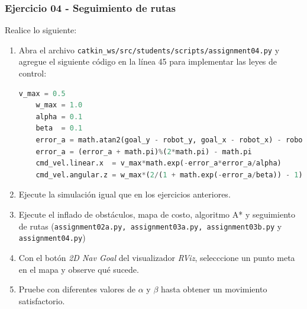 \begin{frame}[containsverbatim]\frametitle{Ejercicio 04 - Seguimiento de rutas}
  Realice lo siguiente:
  \begin{enumerate}
  \item Abra el archivo \texttt{catkin\_ws/src/students/scripts/assignment04.py} y agregue el siguiente código en la línea 45 para implementar las leyes de control:
    \begin{lstlisting}[language=Python,firstnumber=45]
    v_max = 0.5
    w_max = 1.0
    alpha = 0.1
    beta  = 0.1
    error_a = math.atan2(goal_y - robot_y, goal_x - robot_x) - robot_a
    error_a = (error_a + math.pi)%(2*math.pi) - math.pi 
    cmd_vel.linear.x  = v_max*math.exp(-error_a*error_a/alpha)
    cmd_vel.angular.z = w_max*(2/(1 + math.exp(-error_a/beta)) - 1)
  \end{lstlisting}
  \item Ejecute la simulación igual que en los ejercicios anteriores. 
  \item Ejecute el inflado de obstáculos, mapa de costo, algoritmo A* y seguimiento de rutas (\texttt{assignment02a.py, assignment03a.py, assignment03b.py} y \texttt{assignment04.py})
  \item Con el botón \textit{2D Nav Goal} del visualizador \textit{RViz}, selecccione un punto meta en el mapa y observe qué sucede. 
  \item Pruebe con diferentes valores de $\alpha$ y $\beta$ hasta obtener un movimiento satisfactorio. 
  \end{enumerate}
\end{frame}


